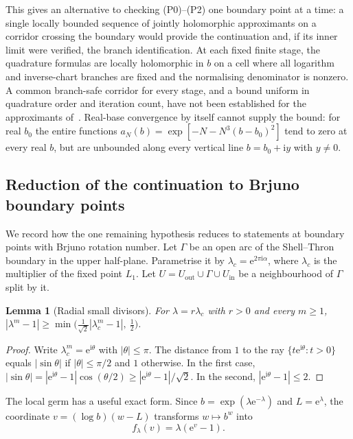 \documentclass[11pt,a4paper]{article}
\newtheorem{lemma}[theorem]{Lemma}
\theoremstyle{definition}
\newcommand{\eee}{\mathrm{e}}
\newcommand{\ii}{\mathrm{i}}
\begin{document}
This gives an alternative to checking (P0)--(P2) one boundary point at a
time: a single locally bounded sequence of jointly holomorphic
approximants on a corridor crossing the boundary would provide the
continuation and, if its inner limit were verified, the branch
identification.  At each fixed finite stage, the quadrature formulas are locally
holomorphic in $b$ on a cell where all logarithm and inverse-chart
branches are fixed and the normalising denominator is nonzero.  A
common branch-safe corridor for every stage, and a bound uniform in
quadrature order and iteration count, have not been established for
the approximants of~\cite[\S5]{Paulsen2019}.  Real-base convergence by itself
cannot supply the bound: for real $b_0$ the entire functions
$a_N(b)=\exp[-N-N^3(b-b_0)^2]$ tend to zero at every real $b$, but
are unbounded along every vertical line $b=b_0+\ii y$ with $y\ne0$.

\subsection{Reduction of the continuation to Brjuno boundary points}\label{sec:brjuno}
We record how the one remaining hypothesis reduces to statements at boundary
points with Brjuno rotation number.  Let $\Gamma$ be an open arc of the
Shell--Thron boundary in the upper half-plane.  Parametrise it by
$\lambda_c=\eee^{2\pi\ii\alpha}$, where $\lambda_c$ is the multiplier of the fixed
point $L_1$.  Let $U=U_{\mathrm{out}}\cup\Gamma\cup U_{\mathrm{in}}$ be a
neighbourhood of $\Gamma$ split by it.

\begin{lemma}[Radial small divisors]\label{lem:radial}
For $\lambda=r\lambda_c$ with $r>0$ and every $m\ge1$,
$|\lambda^m-1|\ge\min\bigl(\tfrac1{\sqrt2}|\lambda_c^m-1|,\ \tfrac12\bigr)$.
\end{lemma}

\begin{proof}
Write $\lambda_c^m=\eee^{\ii\theta}$ with $|\theta|\le\pi$.  The distance from $1$
to the ray $\{t\eee^{\ii\theta}:t>0\}$ equals $|\sin\theta|$ if
$|\theta|\le\pi/2$ and $1$ otherwise.  In the first case,
$|\sin\theta|=|\eee^{\ii\theta}-1|\cos(\theta/2)\ge|\eee^{\ii\theta}-1|/\sqrt2$.  In
the second, $|\eee^{\ii\theta}-1|\le2$.
\end{proof}

The local germ has a useful exact form.  Since
$b=\exp(\lambda\eee^{-\lambda})$ and $L=\eee^\lambda$, the coordinate
$v=(\log b)(w-L)$ transforms $w\mapsto b^w$ into
\begin{equation}\label{eq:radial-normal-form}
  f_\lambda(v)=\lambda(\eee^v-1).
\end{equation}
\end{document}
